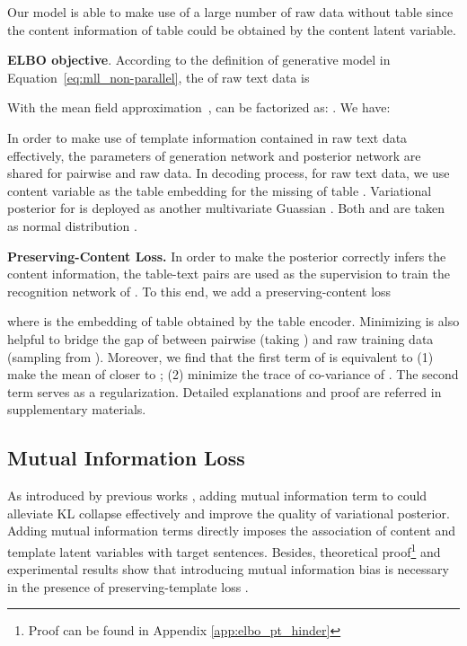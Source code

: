 Our model is able to make use of a large number of raw data without table since the content information of table could be obtained by the content latent variable.

\noindent\textbf{ELBO objective}. \quad
According to the definition of generative model in Equation~\ref{eq:mll_non-parallel}, the  of raw text data is

With the mean field approximation~\citep{xing2002generalized},  can be factorized as: .
We have:

In order to make use of template information contained in raw text data effectively, the parameters of generation network  and posterior network  are shared for pairwise and raw data. In decoding process, for raw text data, we use content variable  as the table embedding for the missing of table . 
Variational posterior for  is deployed as another multivariate Guassian . Both  and  are taken as normal distribution .

\noindent\textbf{Preserving-Content Loss.}\quad
In order to make the posterior  correctly infers the content information, the table-text pairs are used as the supervision to train the recognition network of . To this end, we add a preserving-content loss

where  is the embedding of table obtained by the table encoder. 
Minimizing  is also helpful to bridge the gap of  between pairwise (taking ) and raw training data (sampling from ).
Moreover, we find that the first term of  is equivalent to (1) make the mean of  closer to ; (2) minimize the trace of co-variance of . The second term serves as a regularization. Detailed explanations and proof are referred in supplementary materials. 
































\subsection{Mutual Information Loss}
\label{sec:mutual_info}
As introduced by previous works \citep{chen2016infogan,zhao2017infovae,zhao2018unsupervised}, adding mutual information term to  could  alleviate KL collapse effectively and improve the quality of variational posterior. Adding mutual information terms directly imposes the association of content and template latent variables with target sentences. 
Besides, theoretical proof\footnote{Proof can be found in Appendix \ref{app:elbo_pt_hinder}} and experimental results show that introducing mutual information bias is necessary in the presence of preserving-template loss .

